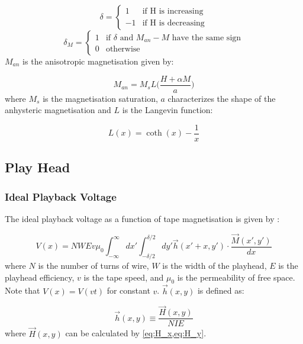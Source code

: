 \documentclass[twoside,a4paper]{article}
\begin{document}
\begin{equation}
    \delta = \begin{cases}
        1 & \text{if H is increasing} \\
        -1 & \text{if H is decreasing}
    \end{cases}
\end{equation}
\begin{equation}
    \delta_M = \begin{cases}
        1 & \text{if $\delta$ and $M_{an} - M$ have the same sign} \\
        0 & \text{otherwise}
    \end{cases}
\end{equation}
%
$M_{an}$ is the anisotropic magnetisation given by:

\begin{equation}
    M_{an} = M_s L \Big( \frac{H + \alpha M}{a} \Big)
\end{equation}
%
where $M_s$ is the magnetisation saturation, $a$ characterizes the shape
of the anhysteric magnetisation and $L$ is the Langevin function:

\begin{equation}
    L(x) = \coth (x) - \frac{1}{x}
\end{equation}

\subsection{Play Head}
\subsubsection{Ideal Playback Voltage}
The ideal playback voltage as a function of tape magnetisation is given by
\cite{1994tmr..book.....B}:

\begin{equation}
    V(x) =  NWEv \mu_0 \int_{-\infty}^{\infty} dx' \int_{-\delta/2}^{\delta/2} dy' \vec{h}(x' + x, y') \cdot \frac{\vec{M}(x', y')}{dx}
    \label{eq:Vx}
\end{equation}
%
where $N$ is the number of turns of wire, $W$ is the width of the playhead, $E$ is the playhead
efficiency, $v$ is the tape speed, and $\mu_0$ is the permeability of free space.
Note that $V(x) = V(vt)$ for constant $v$. $\vec{h}(x, y)$ is defined as:

\begin{equation}
    \vec{h} (x, y) \equiv \frac{\vec{H} (x, y)}{NIE}
    \label{eq12}
\end{equation}
%
where $\vec{H} (x, y)$ can be calculated by \cref{eq:H_x,eq:H_y}.
\end{document}
